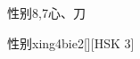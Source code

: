 \begin{entry}{性别}{8,7}{⼼、⼑}
  \begin{phonetics}{性别}{xing4bie2}[][HSK 3]
  \end{phonetics}
\end{entry}
